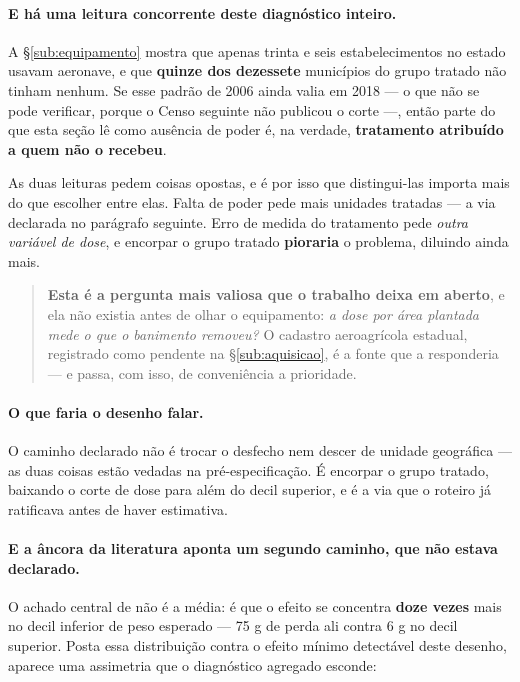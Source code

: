 \paragraph{E há uma leitura concorrente deste diagnóstico inteiro.}
A §\ref{sub:equipamento} mostra que apenas trinta e seis estabelecimentos no
estado usavam aeronave, e que \textbf{quinze dos dezessete} municípios do grupo
tratado não tinham nenhum. Se esse padrão de 2006 ainda valia em 2018
--- o que não se pode verificar, porque o Censo seguinte não publicou o corte ---,
então parte do que esta seção lê como ausência de poder é, na verdade,
\textbf{tratamento atribuído a quem não o recebeu}.

As duas leituras pedem coisas opostas, e é por isso que distingui-las importa
mais do que escolher entre elas. Falta de poder pede mais unidades tratadas ---
a via declarada no parágrafo seguinte. Erro de medida do tratamento pede
\emph{outra variável de dose}, e encorpar o grupo tratado \textbf{pioraria} o
problema, diluindo ainda mais.

\begin{quote}
\textbf{Esta é a pergunta mais valiosa que o trabalho deixa em aberto}, e ela não
existia antes de olhar o equipamento: \emph{a dose por área plantada mede o que
o banimento removeu?} O cadastro aeroagrícola estadual, registrado como pendente
na §\ref{sub:aquisicao}, é a fonte que a responderia --- e passa, com isso, de
conveniência a prioridade.
\end{quote}

\paragraph{O que faria o desenho falar.}
O caminho declarado não é trocar o desfecho nem descer de unidade geográfica ---
as duas coisas estão vedadas na pré-especificação. É encorpar o grupo tratado,
baixando o corte de dose para além do decil superior, e é a via que o roteiro já
ratificava antes de haver estimativa.

\paragraph{E a âncora da literatura aponta um segundo caminho, que não estava
declarado.}
O achado central de \citet{reynier2025glyphosate} não é a média: é que o efeito
se concentra \textbf{doze vezes} mais no decil inferior de peso esperado ---
75 g de perda ali contra 6 g no decil superior. Posta essa distribuição contra o
efeito mínimo detectável deste desenho, aparece uma assimetria que o diagnóstico
agregado esconde:


